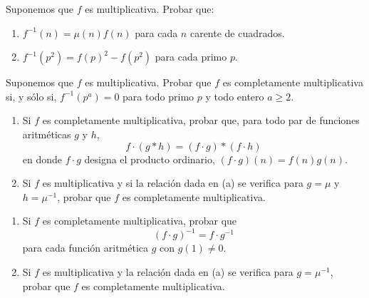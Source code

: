 \documentclass[12pt,a4paper]{book}
\begin{document}
    \begin{ejercicio}
        Suponemos que $f$ es multiplicativa. Probar que:
        \begin{enumerate}
            \item[(a)] $f^{-1}(n)=\mu(n)f(n)$ para cada $n$ carente de cuadrados.
            \item[(b)] $f^{-1}(p^2)=f(p)^2-f(p^2)$ para cada primo $p$.
        \end{enumerate}
    \end{ejercicio}

    \begin{ejercicio}
        Suponemos que $f$ es multiplicativa. Probar que $f$ es completamente
        multiplicativa si, y sólo si, $f^{-1}(p^a)=0$ para todo primo $p$ y todo entero
        $a\geq2$.
    \end{ejercicio}

    \begin{ejercicio}
        \begin{enumerate}
            \item[(a)] Si $f$ es completamente multiplicativa, probar que, para todo par
            de funciones aritméticas $g$ y $h$,
            \begin{equation*}
                f\cdot(g*h)=(f\cdot g)*(f\cdot h)
            \end{equation*}
            en donde $f\cdot g$ designa el producto ordinario, $(f\cdot g)(n)=f(n)g(n)$.
            \item[(b)] Si $f$ es multiplicativa y si la relación dada en (a) se verifica
            para $g=\mu$ y $h=\mu^{-1}$, probar que $f$ es completamente multiplicativa.
        \end{enumerate}
    \end{ejercicio}

    \begin{ejercicio}
        \begin{enumerate}
            \item[(a)] Si $f$ es completamente multiplicativa, probar que
            \begin{equation*}
                (f\cdot g)^{-1}=f\cdot g^{-1}
            \end{equation*}
            para cada función aritmética $g$ con $g(1)\neq0$.
            \item[(b)] Si $f$ es multiplicativa y la relación dada en (a) se verifica para
            $g=\mu^{-1}$, probar que $f$ es completamente multiplicativa.
        \end{enumerate}
    \end{ejercicio}
\end{document}
